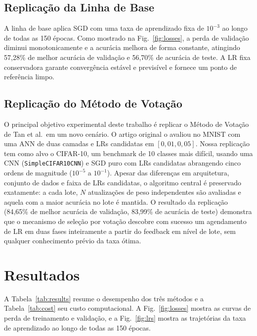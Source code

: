 \documentclass[conference]{IEEEtran}
\begin{document}
\subsection{Replicação da Linha de Base}

A linha de base aplica SGD com uma taxa de aprendizado fixa de $10^{-3}$ ao longo de todas as 150 épocas. Como mostrado na Fig.~\ref{fig:losses}, a perda de validação diminui monotonicamente e a acurácia melhora de forma constante, atingindo 57,28\% de melhor acurácia de validação e 56,70\% de acurácia de teste. A LR fixa conservadora garante convergência estável e previsível e fornece um ponto de referência limpo.

\subsection{Replicação do Método de Votação}

O principal objetivo experimental deste trabalho é replicar o Método de Votação de Tan et al.\ em um novo cenário. O artigo original o avaliou no MNIST com uma ANN de duas camadas e LRs candidatas em $[0{,}01, 0{,}05]$. Nossa replicação tem como alvo o CIFAR-10, um benchmark de 10 classes mais difícil, usando uma CNN (\texttt{SimpleCIFAR10CNN}) e SGD puro com LRs candidatas abrangendo cinco ordens de magnitude ($10^{-5}$ a $10^{-1}$). Apesar das diferenças em arquitetura, conjunto de dados e faixa de LRs candidatas, o algoritmo central é preservado exatamente: a cada lote, $N$ atualizações de peso independentes são avaliadas e aquela com a maior acurácia no lote é mantida. O resultado da replicação (84,65\% de melhor acurácia de validação, 83,99\% de acurácia de teste) demonstra que o mecanismo de seleção por votação descobre com sucesso um agendamento de LR em duas fases inteiramente a partir do feedback em nível de lote, sem qualquer conhecimento prévio da taxa ótima.

\section{Resultados}

A Tabela~\ref{tab:results} resume o desempenho dos três métodos e a Tabela~\ref{tab:cost} seu custo computacional. A Fig.~\ref{fig:losses} mostra as curvas de perda de treinamento e validação, e a Fig.~\ref{fig:lrs} mostra as trajetórias da taxa de aprendizado ao longo de todas as 150 épocas.
\end{document}
